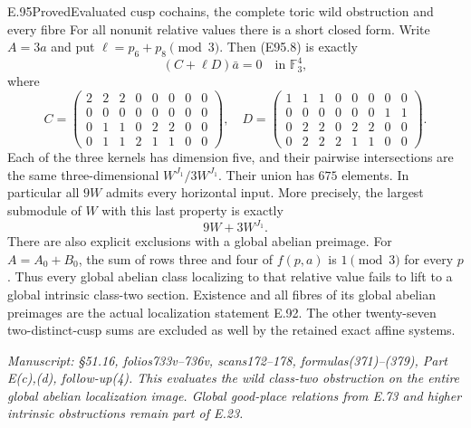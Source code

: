 \begin{statement}{E.95}{Proved}{Evaluated cusp cochains, the complete toric wild obstruction and every fibre}
For all nonunit relative values there is a short closed
form. Write $A=3a$ and put $\ell=p_6+p_8\pmod3$. Then
(E95.8) is exactly
\[
       (C+\ell D)\bar a=0\quad\text{in }\mathbb F_3^4,
 \tag{E95.15}
\]
where
\[
 C=\begin{pmatrix}
2&2&2&0&0&0&0&0\\0&0&0&0&0&0&0&0\\
0&1&1&0&2&2&0&0\\0&1&1&2&1&1&0&0
\end{pmatrix},\quad
 D=\begin{pmatrix}
1&1&1&0&0&0&0&0\\0&0&0&0&0&0&1&1\\
0&2&2&0&2&2&0&0\\0&2&2&2&1&1&0&0
\end{pmatrix}.
 \tag{E95.16}
\]
Each of the three kernels has dimension five, and their
pairwise intersections are the same three-dimensional
$W^{J_1}/3W^{J_1}$. Their union has $675$ elements.
In particular all $9W$ admits every horizontal input.
More precisely, the largest submodule of $W$ with this
last property is exactly
\[
                      9W+3W^{J_1}.
 \tag{E95.17}
\]
There are also explicit exclusions with a global abelian
preimage. For $A=A_0+B_0$, the sum of rows three and four
of $f(p,a)$ is $1\pmod3$ for every $p$. Thus every global
abelian class localizing to that relative value fails to
lift to a global intrinsic class-two section. Existence
and all fibres of its global abelian preimages are the
actual localization statement E.92. The other twenty-seven
two-distinct-cusp sums are excluded as well by the retained
exact affine systems.

\emph{Manuscript: \S51.16, folios733v--736v,
scans172--178, formulas(371)--(379), Part E(c),(d),
follow-up(4). This evaluates the wild class-two obstruction
on the entire global abelian localization image. Global
good-place relations from E.73 and higher intrinsic
obstructions remain part of E.23.}
\end{statement}


